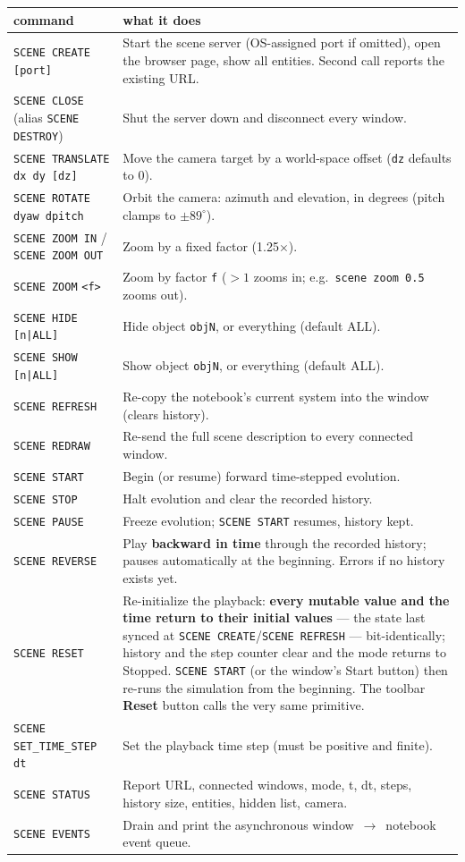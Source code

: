 \documentclass[11pt]{article}
\newcommand{\kw}[1]{\texttt{\uppercase{#1}}}
\newcommand{\code}[1]{\texttt{#1}}
\begin{document}
\begin{center}
\begin{longtable}{p{5.4cm}p{9.0cm}}
\textbf{command} & \textbf{what it does}\\\hline
\kw{scene create} \code{[port]} & Start the scene server (OS-assigned port if omitted), open the browser page, show all entities. Second call reports the existing URL.\\
\kw{scene close} (alias \kw{scene destroy}) & Shut the server down and disconnect every window.\\
\kw{scene translate} \code{dx dy [dz]} & Move the camera target by a world-space offset (\code{dz} defaults to 0).\\
\kw{scene rotate} \code{dyaw dpitch} & Orbit the camera: azimuth and elevation, in degrees (pitch clamps to $\pm 89^\circ$).\\
\kw{scene zoom in} / \kw{scene zoom out} & Zoom by a fixed factor (1.25$\times$).\\
\kw{scene zoom} \code{<f>} & Zoom by factor \code{f} ($>1$ zooms in; e.g.\ \code{scene zoom 0.5} zooms out).\\
\kw{scene hide} \code{[n|ALL]} & Hide object \code{objN}, or everything (default ALL).\\
\kw{scene show} \code{[n|ALL]} & Show object \code{objN}, or everything (default ALL).\\
\kw{scene refresh} & Re-copy the notebook's current system into the window (clears history).\\
\kw{scene redraw} & Re-send the full scene description to every connected window.\\
\kw{scene start} & Begin (or resume) forward time-stepped evolution.\\
\kw{scene stop} & Halt evolution and clear the recorded history.\\
\kw{scene pause} & Freeze evolution; \kw{scene start} resumes, history kept.\\
\kw{scene reverse} & Play \textbf{backward in time} through the recorded history; pauses automatically at the beginning. Errors if no history exists yet.\\
\kw{scene reset} & Re-initialize the playback: \textbf{every mutable value and the time return to their initial values} --- the state last synced at \kw{scene create}/\kw{scene refresh} --- bit-identically; history and the step counter clear and the mode returns to Stopped. \kw{scene start} (or the window's Start button) then re-runs the simulation from the beginning. The toolbar \textbf{Reset} button calls the very same primitive.\\
\kw{scene set\_time\_step} \code{dt} & Set the playback time step (must be positive and finite).\\
\kw{scene status} & Report URL, connected windows, mode, t, dt, steps, history size, entities, hidden list, camera.\\
\kw{scene events} & Drain and print the asynchronous window~$\to$~notebook event queue.\\
\end{longtable}
\end{center}
\end{document}
